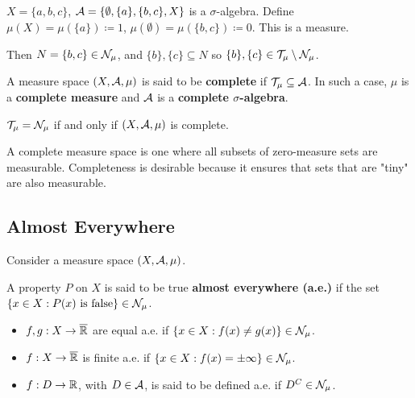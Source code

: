 \begin{example}
$X = \{a,b,c\}$, $\mathcal{A} = \{\emptyset, \{a\}, \{b,c\}, X\}$ is a $\sigma$-algebra.
Define $\mu(X) = \mu(\{a\}) \coloneqq 1$, $\mu(\emptyset) = \mu(\{b,c\}) \coloneqq 0$. This is a measure.

Then $N = \{b,c\} \in \mathcal{N}_\mu$, and $\{b\}, \{c\} \subseteq N$ so $\{b\}, \{c\} \in \mathcal{T}_\mu \setminus \mathcal{N}_\mu$.
\end{example}

\begin{definition}
A measure space $(X, \mathcal{A}, \mu)$ is said to be \textbf{complete} if $\mathcal{T}_\mu \subseteq \mathcal{A}$.
In such a case, $\mu$ is a \textbf{complete measure} and $\mathcal{A}$ is a \textbf{complete $\sigma$-algebra}.
\end{definition}

\begin{remark}
$\mathcal{T}_\mu = \mathcal{N}_\mu$ if and only if $(X, \mathcal{A}, \mu)$ is complete.
\end{remark}

\begin{remark}
A complete measure space is one where all subsets of zero-measure sets are measurable. Completeness is desirable because it ensures that sets that are "tiny" are also measurable.
\end{remark}

\clearpage
\subsection{Almost Everywhere}
Consider a measure space $(X, \mathcal{A}, \mu)$.

\begin{definition}
A property $P$ on $X$ is said to be true \textbf{almost everywhere (a.e.)} if the set $\{x \in X : P(x) \text{ is false}\} \in \mathcal{N}_\mu$.
\end{definition}

\begin{example}
\begin{itemize}
    \item $f, g: X \to \overline{\mathbb{R}}$ are equal a.e. if $\{x \in X : f(x) \neq g(x)\} \in \mathcal{N}_\mu$.
    \item $f: X \to \overline{\mathbb{R}}$ is finite a.e. if $\{x \in X : f(x) = \pm \infty\} \in \mathcal{N}_\mu$.
    \item $f: D \to \mathbb{R}$, with $D \in \mathcal{A}$, is said to be defined a.e. if $D^C \in \mathcal{N}_\mu$.
\end{itemize}
\end{example}

